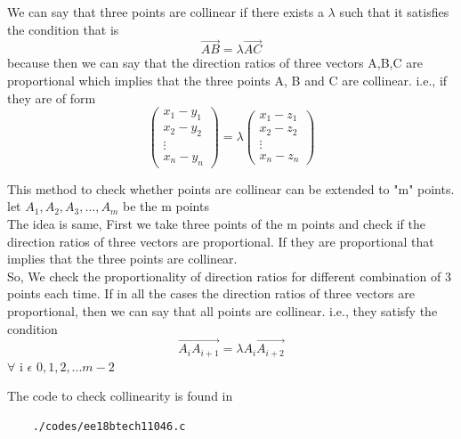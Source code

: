 \documentclass[journal,12pt,twocolumn]{IEEEtran}
\begin{document}
We can say that three points are collinear if there exists a $\lambda$
such that it satisfies the condition that is
\begin{equation}
    \overrightarrow{AB} = \lambda\overrightarrow{AC}
\end{equation}
because then we can say that the direction ratios of
three vectors A,B,C are proportional which implies
that the three points A, B and C are collinear.
i.e., if they are of form
\[
    \begin{pmatrix}
        x_{1}-y_{1} \\
        x_{2}-y_{2} \\
        \vdots      \\
        x_{n}-y_{n}
    \end{pmatrix}
    =
    \lambda \begin{pmatrix}
        x_{1}-z_{1} \\
        x_{2}-z_{2} \\
        \vdots      \\
        x_{n}-z_{n}
    \end{pmatrix}
\]

This method to check whether points are collinear can
be extended to "m" points.
\\
\newline
let $A_{1},A_{2},A_{3},...,A_{m}$ be the m points
\\
\newline
The idea is same, First we take three points of the
m points and check if the direction ratios of
three vectors are proportional. If they are proportional
that implies that the three points are collinear.
\\
So, We check the proportionality of direction ratios
for different combination of 3 points each time.
If in all the cases the direction ratios of
three vectors are proportional, then we can say that
all points are collinear. i.e., they satisfy the
condition
\\
\begin{equation}
    \overrightarrow{A_{i}A_{i+1}} = \lambda\overrightarrow{A_{i}A_{i+2}}
\end{equation}
$\forall$ i $\epsilon$ ${0,1,2,...m-2}$

The code to check collinearity is found in
\begin{lstlisting}
    ./codes/ee18btech11046.c
\end{lstlisting}
\end{document}
